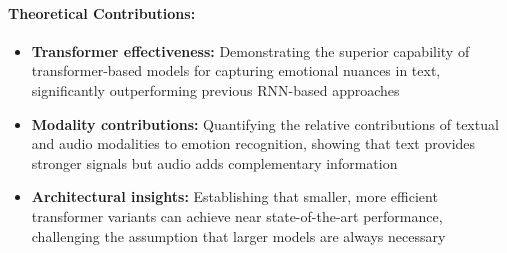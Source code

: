 \documentclass[12pt]{article}
\begin{document}
\paragraph{Theoretical Contributions:}
\begin{itemize}
    \item \textbf{Transformer effectiveness:} Demonstrating the superior capability of transformer-based models for capturing emotional nuances in text, significantly outperforming previous RNN-based approaches

    \item \textbf{Modality contributions:} Quantifying the relative contributions of textual and audio modalities to emotion recognition, showing that text provides stronger signals but audio adds complementary information

    \item \textbf{Architectural insights:} Establishing that smaller, more efficient transformer variants can achieve near state-of-the-art performance, challenging the assumption that larger models are always necessary
\end{itemize}
\end{document}
